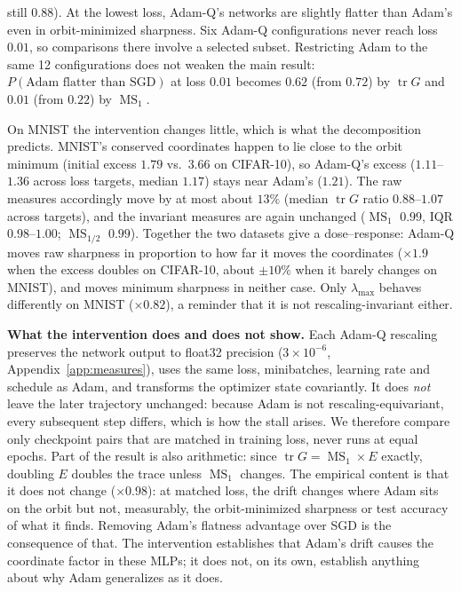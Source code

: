 \documentclass[10pt]{article}
\theoremstyle{remark}
\newcommand{\tr}{\operatorname{tr}}
\newcommand{\MS}{\operatorname{MS}}
\begin{document}
still $0.88$). At the lowest loss, Adam-Q's networks are slightly flatter than Adam's even in orbit-minimized sharpness. Six Adam-Q configurations never reach loss $0.01$, so comparisons there involve a selected subset. Restricting Adam to the same 12 configurations does not weaken the main result: $P(\text{Adam flatter than SGD})$ at loss $0.01$ becomes $0.62$ (from $0.72$) by $\tr G$ and $0.01$ (from $0.22$) by $\MS_1$.

On MNIST the intervention changes little, which is what the decomposition predicts. MNIST's conserved coordinates happen to lie close to the orbit minimum (initial excess $1.79$ vs.\ $3.66$ on CIFAR-10), so Adam-Q's excess ($1.11$--$1.36$ across loss targets, median $1.17$) stays near Adam's ($1.21$). The raw measures accordingly move by at most about $13\%$ (median $\tr G$ ratio $0.88$--$1.07$ across targets), and the invariant measures are again unchanged ($\MS_1$ $0.99$, IQR $0.98$--$1.00$; $\MS_{1/2}$ $0.99$). Together the two datasets give a dose--response: Adam-Q moves raw sharpness in proportion to how far it moves the coordinates ($\times1.9$ when the excess doubles on CIFAR-10, about $\pm10\%$ when it barely changes on MNIST), and moves minimum sharpness in neither case. Only $\lambda_{\max}$ behaves differently on MNIST ($\times0.82$), a reminder that it is not rescaling-invariant either.

\textbf{What the intervention does and does not show.} Each Adam-Q rescaling preserves the network output to float32 precision ($3\times10^{-6}$, Appendix~\ref{app:measures}), uses the same loss, minibatches, learning rate and schedule as Adam, and transforms the optimizer state covariantly. It does \emph{not} leave the later trajectory unchanged: because Adam is not rescaling-equivariant, every subsequent step differs, which is how the stall arises. We therefore compare only checkpoint pairs that are matched in training loss, never runs at equal epochs. Part of the result is also arithmetic: since $\tr G=\MS_1\times E$ exactly, doubling $E$ doubles the trace unless $\MS_1$ changes. The empirical content is that it does not change ($\times0.98$): at matched loss, the drift changes where Adam sits on the orbit but not, measurably, the orbit-minimized sharpness or test accuracy of what it finds. Removing Adam's flatness advantage over SGD is the consequence of that. The intervention establishes that Adam's drift causes the coordinate factor in these MLPs; it does not, on its own, establish anything about why Adam generalizes as it does.
\end{document}
